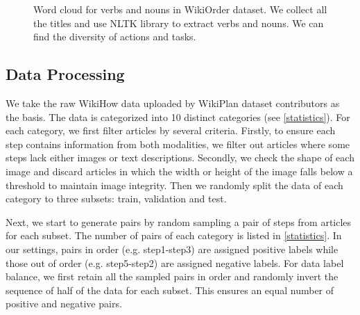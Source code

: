 \documentclass[11pt]{article}
\begin{document}
\begin{figure}[htp]
\centering 
{}\hspace{10mm}
\caption{\label{fig:wordcloud}Word cloud for verbs and nouns in WikiOrder dataset. We collect all the titles and use NLTK library to extract verbs and nouns. We can find the diversity of actions and tasks.}
\end{figure}

\subsection{Data Processing}
We take the raw WikiHow data uploaded by WikiPlan dataset contributors as the basis. The data is categorized into 10 distinct categories (see \autoref{statistics}). For each category, we first filter articles by several criteria. Firstly, to ensure each step contains information from both modalities, we filter out articles where some steps lack either images or text descriptions. Secondly, we check the shape of each image and discard articles in which the width or height of the image falls below a threshold to maintain image integrity. Then we randomly split the data of each category to three subsets: train, validation and test. 

Next, we start to generate pairs by random sampling a pair of steps from articles for each subset. The number of pairs of each category is listed in \autoref{statistics}. In our settings, pairs in order (e.g. step1-step3) are assigned positive labels while those out of order (e.g. step5-step2) are assigned negative labels. For data label balance, we first retain all the sampled pairs in order and randomly invert the sequence of half of the data for each subset. This ensures an equal number of positive and negative pairs.
\end{document}
